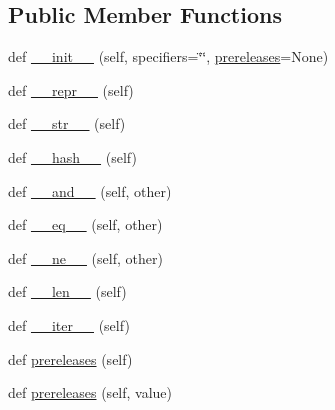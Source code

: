 \subsection*{Public Member Functions}
\begin{DoxyCompactItemize}
\item 
def \hyperlink{classsetuptools_1_1__vendor_1_1packaging_1_1specifiers_1_1SpecifierSet_a89508eb490090d8c31195cae72666503}{\+\_\+\+\_\+init\+\_\+\+\_\+} (self, specifiers=\char`\"{}\char`\"{}, \hyperlink{classsetuptools_1_1__vendor_1_1packaging_1_1specifiers_1_1SpecifierSet_a853e4fea5cc762607cd242de08e83b9b}{prereleases}=None)
\item 
def \hyperlink{classsetuptools_1_1__vendor_1_1packaging_1_1specifiers_1_1SpecifierSet_a4007331afa7b0c266a2ed4f4e9d3b40b}{\+\_\+\+\_\+repr\+\_\+\+\_\+} (self)
\item 
def \hyperlink{classsetuptools_1_1__vendor_1_1packaging_1_1specifiers_1_1SpecifierSet_a6df5288c0bf7a9b10183a7d9c667e8d2}{\+\_\+\+\_\+str\+\_\+\+\_\+} (self)
\item 
def \hyperlink{classsetuptools_1_1__vendor_1_1packaging_1_1specifiers_1_1SpecifierSet_a5272cd143266c1cee63e0df6b326e16f}{\+\_\+\+\_\+hash\+\_\+\+\_\+} (self)
\item 
def \hyperlink{classsetuptools_1_1__vendor_1_1packaging_1_1specifiers_1_1SpecifierSet_a0212610470daa5da38c796cabf4bd25b}{\+\_\+\+\_\+and\+\_\+\+\_\+} (self, other)
\item 
def \hyperlink{classsetuptools_1_1__vendor_1_1packaging_1_1specifiers_1_1SpecifierSet_ad7d988a78a469f377f8f76cc82a675ff}{\+\_\+\+\_\+eq\+\_\+\+\_\+} (self, other)
\item 
def \hyperlink{classsetuptools_1_1__vendor_1_1packaging_1_1specifiers_1_1SpecifierSet_a9639e0bb1c7680706d35612f9c9db854}{\+\_\+\+\_\+ne\+\_\+\+\_\+} (self, other)
\item 
def \hyperlink{classsetuptools_1_1__vendor_1_1packaging_1_1specifiers_1_1SpecifierSet_a8eb5926cf70aeb1f3cab6f804e9c271e}{\+\_\+\+\_\+len\+\_\+\+\_\+} (self)
\item 
def \hyperlink{classsetuptools_1_1__vendor_1_1packaging_1_1specifiers_1_1SpecifierSet_ad2d7cab8bffee5783e6a0f12ab3ae0d1}{\+\_\+\+\_\+iter\+\_\+\+\_\+} (self)
\item 
def \hyperlink{classsetuptools_1_1__vendor_1_1packaging_1_1specifiers_1_1SpecifierSet_a853e4fea5cc762607cd242de08e83b9b}{prereleases} (self)
\item 
def \hyperlink{classsetuptools_1_1__vendor_1_1packaging_1_1specifiers_1_1SpecifierSet_af4a00d47a94e0ec77eca7ceccd9f752d}{prereleases} (self, value)

\end{DoxyCompactItemize}
